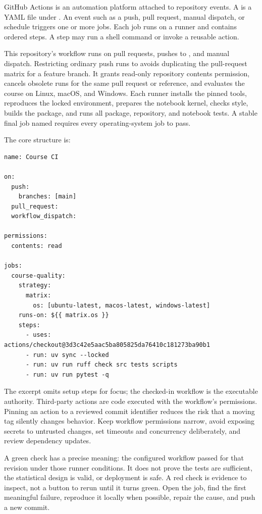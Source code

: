 GitHub Actions is an automation platform attached to repository events. A
 is a YAML file under . An event such as
a push, pull request, manual dispatch, or schedule triggers one or more jobs.
Each job runs on a runner and contains ordered steps. A step may run a shell
command or invoke a reusable action.

This repository's  workflow runs on pull requests, pushes
to , and manual dispatch. Restricting ordinary push runs to
 avoids duplicating the pull-request matrix for a feature branch. It
grants read-only repository contents permission, cancels obsolete runs for the
same pull request or reference, and evaluates the course on Linux, macOS, and
Windows. Each runner installs the pinned tools, reproduces the locked
environment, prepares the notebook kernel, checks style, builds the package,
and runs all package, repository, and notebook tests. A stable final job named
 requires every operating-system job to pass.

The core structure is:

\begin{lstlisting}[numbers=none]
name: Course CI

on:
  push:
    branches: [main]
  pull_request:
  workflow_dispatch:

permissions:
  contents: read

jobs:
  course-quality:
    strategy:
      matrix:
        os: [ubuntu-latest, macos-latest, windows-latest]
    runs-on: ${{ matrix.os }}
    steps:
      - uses: actions/checkout@3d3c42e5aac5ba805825da76410c181273ba90b1
      - run: uv sync --locked
      - run: uv run ruff check src tests scripts
      - run: uv run pytest -q
\end{lstlisting}

The excerpt omits setup steps for focus; the checked-in workflow is the
executable authority. Third-party actions are code executed with the workflow's
permissions. Pinning an action to a reviewed commit identifier reduces the risk
that a moving tag silently changes behavior. Keep workflow permissions narrow,
avoid exposing secrets to untrusted changes, set timeouts and concurrency
deliberately, and review dependency updates.

A green check has a precise meaning: the configured workflow passed for that
revision under those runner conditions. It does not prove the tests are
sufficient, the statistical design is valid, or deployment is safe. A red check
is evidence to inspect, not a button to rerun until it turns green. Open the job,
find the first meaningful failure, reproduce it locally when possible, repair
the cause, and push a new commit.

